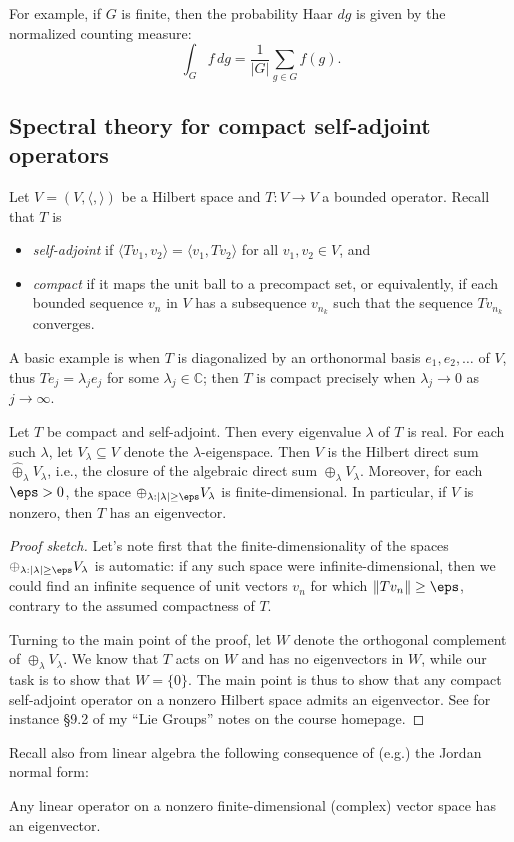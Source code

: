 \documentclass[reqno]{amsart} 
\begin{document}
For example, if $G$ is finite, then the probability Haar $d g$ is given by the normalized counting measure:
\begin{equation*}
  \int_G f \, d g = \frac{1}{|G|} \sum_{g \in G} f(g).
\end{equation*}

\subsection{Spectral theory for compact self-adjoint operators}\label{sec:spectr-theory-comp}
Let $V = (V, \langle , \rangle)$ be a Hilbert space and $T : V \rightarrow V$ a bounded operator.  Recall that $T$ is
\begin{itemize}
\item \emph{self-adjoint} if $\langle T v_1, v_2 \rangle = \langle v_1, T v_2 \rangle$ for all $v_1, v_2 \in V$, and
\item \emph{compact} if it maps the unit ball to a precompact set, or equivalently, if each bounded sequence $v_n$ in $V$ has a subsequence $v_{n_k}$ such that the sequence $T v_{n_k}$ converges.
\end{itemize}
A basic example is when $T$ is diagonalized by an orthonormal basis $e_1,e_2,\dotsc$ of $V$, thus $T e_j = \lambda_j e_j$ for some $\lambda_j \in \mathbb{C}$; then $T$ is compact precisely when $\lambda_j \rightarrow 0$ as $j \rightarrow \infty$.
\begin{theorem}\label{thm:spectral-theorem-compact}
  Let $T$ be compact and self-adjoint.  Then every eigenvalue $\lambda$ of $T$ is real.  For each such $\lambda$, let $V_\lambda \subseteq V$ denote the $\lambda$-eigenspace.  Then $V$ is the Hilbert direct sum $\hat{\oplus}_{\lambda} V_\lambda$, i.e., the closure of the algebraic direct sum $\oplus_{\lambda} V_\lambda$.  Moreover, for each $\eps > 0$, the space $\oplus_{\lambda : |\lambda| \geq \eps } V_\lambda$ is finite-dimensional.  In particular, if $V$ is nonzero, then $T$ has an eigenvector.
\end{theorem}
\begin{proof}
[Proof sketch]
  Let's note first that the finite-dimensionality of the spaces $\oplus_{\lambda : |\lambda| \geq \eps } V_\lambda$ is automatic: if any such space were infinite-dimensional, then we could find an infinite sequence of unit vectors $v_n$ for which $\|T v_n\| \geq \eps$, contrary to the assumed compactness of $T$.

  Turning to the main point of the proof, let $W$ denote the orthogonal complement of $\oplus_{\lambda} V_\lambda$.  We know that $T$ acts on $W$ and has no eigenvectors in $W$, while our task is to show that $W = \{0\}$.  The main point is thus to show that any compact self-adjoint operator on a nonzero Hilbert space admits an eigenvector.  See for instance \S9.2 of my ``Lie Groups'' notes on the course homepage.
\end{proof}
Recall also from linear algebra the following consequence of (e.g.)  the Jordan normal form:
\begin{lemma}
  Any linear operator on a nonzero finite-dimensional (complex) vector space has an eigenvector.
\end{lemma}
\end{document}
